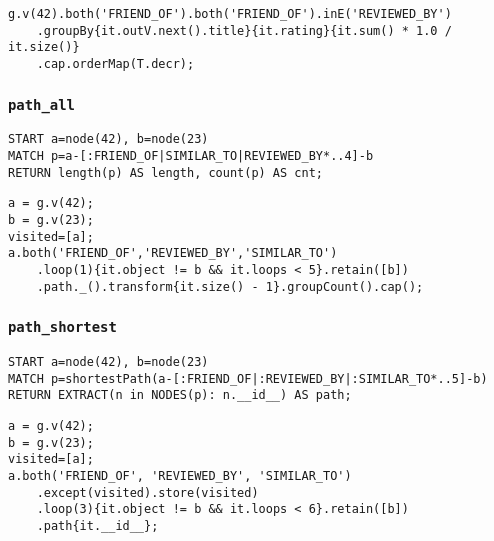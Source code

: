 \begin{lstlisting}
g.v(42).both('FRIEND_OF').both('FRIEND_OF').inE('REVIEWED_BY')
	.groupBy{it.outV.next().title}{it.rating}{it.sum() * 1.0 / it.size()}
	.cap.orderMap(T.decr);
\end{lstlisting}

\subsubsection*{\texttt{path\_all}}

\begin{lstlisting}
START a=node(42), b=node(23) 
MATCH p=a-[:FRIEND_OF|SIMILAR_TO|REVIEWED_BY*..4]-b 
RETURN length(p) AS length, count(p) AS cnt;
\end{lstlisting}

\begin{lstlisting}
a = g.v(42);
b = g.v(23);
visited=[a];
a.both('FRIEND_OF','REVIEWED_BY','SIMILAR_TO')
	.loop(1){it.object != b && it.loops < 5}.retain([b])
	.path._().transform{it.size() - 1}.groupCount().cap();
\end{lstlisting}

\subsubsection*{\texttt{path\_shortest}}

\begin{lstlisting}
START a=node(42), b=node(23)
MATCH p=shortestPath(a-[:FRIEND_OF|:REVIEWED_BY|:SIMILAR_TO*..5]-b)
RETURN EXTRACT(n in NODES(p): n.__id__) AS path;
\end{lstlisting}

\begin{lstlisting}
a = g.v(42);
b = g.v(23);
visited=[a];
a.both('FRIEND_OF', 'REVIEWED_BY', 'SIMILAR_TO')
	.except(visited).store(visited)
	.loop(3){it.object != b && it.loops < 6}.retain([b])
	.path{it.__id__};
\end{lstlisting}

